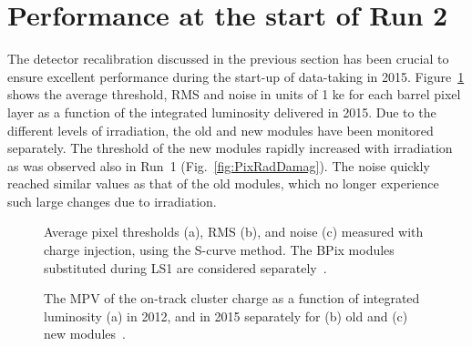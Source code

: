 
\section{Performance at the start of Run 2}\label{sec:BPixPerf2015}

The detector recalibration discussed in the previous section has been crucial to ensure excellent performance during the start-up of data-taking in 2015.
Figure~\ref{fig:ThrVsLumi2015} shows the average threshold, RMS and noise in units of 1 ke for each barrel pixel layer as a function of the integrated luminosity delivered in 2015.
Due to the different levels of irradiation, the old and new modules have been monitored separately.
The threshold of the new modules rapidly increased with irradiation as was observed also in Run~1 (Fig.~\ref{fig:PixRadDamag}).
The noise quickly reached similar values as that of the old modules, which no longer experience such large changes due to irradiation.

\begin{figure}[!htb]
 \begin{center}
 \end{center}
 \caption{Average pixel thresholds (a), RMS (b), and noise (c) measured with charge injection, using the S-curve method. The BPix modules substituted during LS1 are considered separately~\cite{PixelOffline}.}
 \label{fig:ThrVsLumi2015}
\end{figure}

\begin{figure}[!htb]
 \begin{center}
 \end{center}
 \caption{The MPV of the on-track cluster charge as a function of integrated luminosity (a) in 2012, and in 2015 separately for (b) old and (c) new modules~\cite{PixelOffline}.}
 \label{fig:ClusterChargeVsLumi}
\end{figure}

